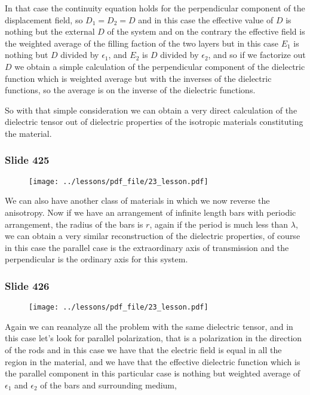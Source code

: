 \documentclass[../main/main.tex]{subfiles}
\begin{document}
In that case the continuity equation holds for the perpendicular component of the displacement field, so $D_1=D_2=D$ and in this case the effective value of $D$ is nothing but the external $D$ of the system and on the contrary the effective field is the weighted average of the filling faction of the two layers but in this case $E_1$ is nothing but $D$ divided by $\epsilon_1$, and $E_2$ is $D$ divided by $\epsilon_2$, and so if we factorize out $D$ we obtain a simple calculation of the perpendicular component of the dielectric function which is weighted average but with the inverses of the dielectric functions, so the average is on the inverse of the dielectric functions.

So with that simple consideration we can obtain a very direct calculation of the dielectric tensor out of dielectric properties of the isotropic materials constituting the material. 

\newpage

\subsubsection{Slide 425}

\begin{figure}[h!]
\centering
\texttt{[image: ../lessons/pdf\_file/23\_lesson.pdf]}
\end{figure}

We can also have another class of materials in which we now reverse the anisotropy. Now if we have an arrangement of infinite length bars with periodic arrangement, the  radius of the bars is $r$, again if the period is much less than $\lambda$, we can obtain a very similar reconstruction of the dielectric properties, of course in this case the parallel case is the extraordinary axis of transmission and the perpendicular is the ordinary axis for this system.

\newpage

\subsubsection{Slide 426}

\begin{figure}[h!]
\centering
\texttt{[image: ../lessons/pdf\_file/23\_lesson.pdf]}
\end{figure}

Again we can reanalyze all the problem with the same dielectric tensor, and in this case let's look for parallel polarization, that is a polarization in the direction of the rods and in this case we have that the electric field is equal in all the region in the material, and we have that the effective dielectric function which is the parallel component in this particular case is nothing but weighted average of $\epsilon_1$ and $\epsilon_2$ of the bars and surrounding medium,
\end{document}
